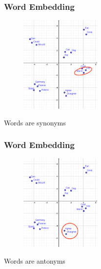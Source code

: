 \begin{frame}
	\frametitle{Word Embedding}

	\begin{figure}
		\includegraphics[width=4cm]{./figures/Group_synonym}

	\end{figure}
		\begin{center}
		{Words are synonyms}
		\end{center}
	\vspace{-0.5cm}

\end{frame}



\begin{frame}
	\frametitle{Word Embedding}

	\begin{figure}
		\includegraphics[width=4cm]{./figures/Group_antonyms}

	\end{figure}
		\begin{center}
		{Words are antonyms}
		\end{center}
	\vspace{-0.5cm}

\end{frame}


